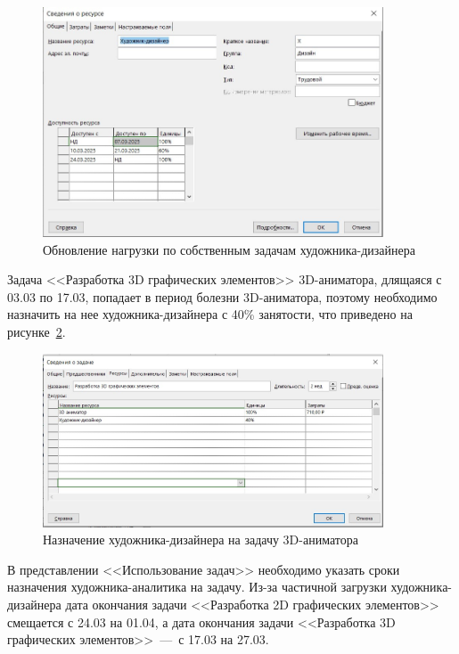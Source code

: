 \begin{figure}[H]
	\centering
	\includegraphics[width=0.9\textwidth]{img/lab4/screen4.jpg}
	\caption{Обновление нагрузки по собственным задачам художника-дизайнера}
	\label{fig:4_screen4}
\end{figure}

Задача <<Разработка 3D графических элементов>> 3D-аниматора, длящаяся с 03.03 по 17.03, попадает в период болезни 3D-аниматора, поэтому необходимо назначить на нее художника-дизайнера с 40\% занятости, что приведено на рисунке~\ref{fig:screen32}.

\begin{figure}[H]
	\centering
	\includegraphics[width=0.9\textwidth]{img/lab4/screen32.jpg}
	\caption{Назначение художника-дизайнера на задачу 3D-аниматора}
	\label{fig:screen32}
\end{figure}

В представлении <<Использование задач>> необходимо указать сроки назначения художника-аналитика на задачу.
Из-за частичной загрузки художника-дизайнера дата окончания задачи <<Разработка 2D графических элементов>> смещается с 24.03 на 01.04, а дата окончания задачи <<Разработка 3D графических элементов>>~---~с 17.03 на 27.03.

